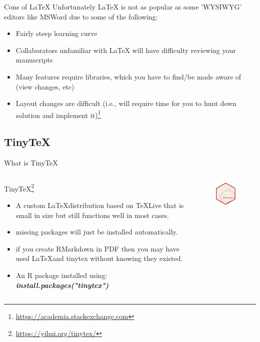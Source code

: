 \documentclass[fleqn]{beamer}\usepackage[]{graphicx}\usepackage[]{color}
\begin{document}
\begin{frame}{Cons of \LaTeX{}}
  Unfortunately \LaTeX{} is not as popular as some 'WYSIWYG' editors like MSWord due to some of the following:
  \begin{itemize}%
    \item Fairly steep learning curve
    \item Collaborators unfamiliar with LaTeX will have difficulty reviewing your manuscripts
    \item Many features require libraries, which you have to find/be made aware of (view changes, etc)
    \item Layout changes are difficult (i.e., will require time for you to hunt down solution and implement it)\footnote{\href{https://academia.stackexchange.com/questions/5414/what-are-the-advantages-or-disadvantages-of-using-latex-for-writing-scientific-p}{https://academia.stackexchange.com}}
  \end{itemize}
\end{frame}

\subsection{TinyTeX}
\begin{frame}{What is TinyTeX}
\begin{columns}[T] %
\begin{column}{.48\textwidth}
TinyTeX\footnote{\href{https://yihui.org/tinytex/}{https://yihui.org/tinytex/}}
\begin{itemize}
  \item A custom \LaTeX distribution based on \TeX Live that is small in size but still functions well in most cases. 
  \item missing packages will just be installed automatically. 
  \item if you create RMarkdown in PDF then you may have used \LaTeX and tinytex without knowing they existed.
  \item An R package installed using: \textit{\textbf{install.packages("tinytex")}}
\end{itemize}
\end{column}%
\hfill%
\begin{column}{.48\textwidth}
\begin{figure}[htp]
    \centering
    \includegraphics[width=4cm]{images/logo-tinytex}
\end{figure}
\end{column}%
\end{columns}
\end{frame}
\end{document}
